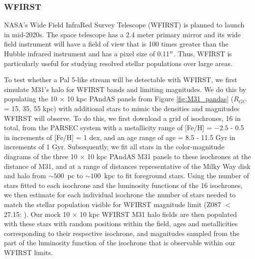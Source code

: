 \documentclass[twocolumn]{aastex62}
\begin{document}
\subsubsection{WFIRST}
\label{sec:WFIRST}
NASA's Wide Field InfraRed Survey Telescope (WFIRST) is planned to launch in mid-2020s. The space telescope has a 2.4 meter primary mirror and its wide field instrument will have a field of view that is 100 times greater than the Hubble infrared instrument and has a pixel size of 0.11$\mbox{$^{\prime\prime}$}$. Thus, WFIRST is particularly useful for studying resolved stellar populations over large areas. 

To test whether a Pal 5-like stream will be detectable with WFIRST, we first simulate M31's halo for WFIRST bands and limiting magnitudes. We do this by populating the 10 $\times$ 10 kpc PAndAS panels from Figure \ref{fig:M31_pandas} ($R_{GC}$ = 15, 35, 55 kpc) with additional stars to mimic the densities and magnitudes WFIRST will observe. To do this, we first download a grid of isochrones, 16 in total, from the PARSEC system with a metallicity range of [Fe/H] = $-2.5$ - 0.5 in increments of [Fe/H] = 1 dex, and an age range of age = 8.5 - 11.5 Gyr in increments of 1 Gyr. Subsequently, we fit all stars in the color-magnitude diagrams of the three 10 $\times$ 10 kpc  PAndAS M31 panels to these isochrones at the distance of M31, and at a range of distances representative of the Milky Way disk and halo from ${\sim}500$~pc to ${\sim}100$~kpc to fit foreground stars. Using the number of stars fitted to each isochrone and the luminosity functions of the 16 isochrones, we then estimate  for each individual isochrone the number of stars needed to match the stellar population visible for WFIRST magnitude limit (Z087 $<$ 27.15: \citealt{spergel13}). Our mock 10 $\times$ 10 kpc WFIRST M31 halo fields are then populated with these stars with random positions within the field, ages and metallicities corresponding to their respective isochrone, and magnitudes sampled from the part of the luminosity function of the isochrone that is observable within our WFIRST limits.
\end{document}
